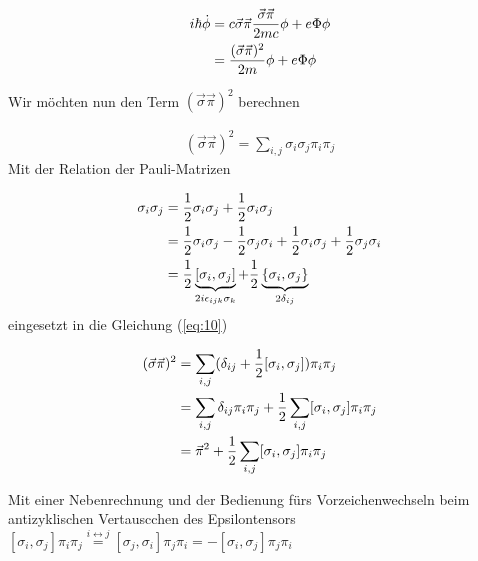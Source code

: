 \begin{align}
  \label{eq:8}
   i\hbar\dot\phi &= c\vec\sigma\vec\pi \frac{\vec\sigma\vec\pi}{2mc}\phi  + e\Phi\phi  \notag \\
 &= \frac{(\vec\sigma\vec\pi)^2}{2m}\phi  + e\Phi\phi
\end{align}

Wir möchten nun den Term \((\vec\sigma\vec\pi)^2\) berechnen

\begin{align}
  \label{eq:10}
  (\vec\sigma\vec\pi)^2 = \sum_{i,j}\sigma_i\sigma_j\pi_i\pi_j
\end{align}
Mit der Relation der Pauli-Matrizen

\begin{align}
  \label{eq:11}
  \sigma_i\sigma_j &= \frac{1}{2}\sigma_i\sigma_j + \frac{1}{2}\sigma_i\sigma_j \notag\\
 &= \frac{1}{2}\sigma_i\sigma_j - \frac{1}{2}\sigma_j\sigma_i  + \frac{1}{2}\sigma_i\sigma_j + \frac{1}{2}\sigma_j\sigma_i  \notag\\
&= \frac{1}{2}\underbr{[\sigma_i,\sigma_j]}_{2i\epsilon_{ijk}\sigma_k} + \frac{1}{2}\underbr{\{\sigma_i,\sigma_j\}}_{2\delta_{ij}}
\end{align}
eingesetzt in die Gleichung (\ref{eq:10})

\begin{align}
  \label{eq:12}
  (\vec\sigma\vec\pi)^2 &= \sum_{i,j}(\delta_{ij} +  \frac{1}{2}[\sigma_i,\sigma_j] )\pi_i\pi_j \notag\\
 &= \sum_{i,j}\delta_{ij}\pi_i\pi_j +  \frac{1}{2}\sum_{i,j}[\sigma_i,\sigma_j] \pi_i\pi_j \notag\\
&= \vec\pi^2 + \frac{1}{2} \sum_{i,j}[\sigma_i,\sigma_j] \pi_i\pi_j 
\end{align}

Mit einer Nebenrechnung und der Bedienung fürs Vorzeichenwechseln beim antizyklischen Vertauscchen des Epsilontensors \( [\sigma_i,\sigma_j] \pi_i\pi_j \stackrel{i\leftrightarrow j}= [\sigma_j,\sigma_i] \pi_j\pi_i = - [\sigma_i,\sigma_j] \pi_j\pi_i  \) 

